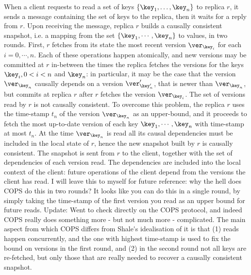 When a client requests to read a set of keys \( \{\key_1, \dots, \key_n\} \) to replica $r$, it sends a message 
containing the set of keys to the replica, then it waits for a reply from $r$. Upon receiving the message, replica $r$ builds a causally consistent snapshot, i.e. 
a mapping from the set $\{\key_{1},\cdots, \key_{n}\}$ to values, in two rounds. 
First, $r$ fetches from its state 
the most recent version \( \ver_{\key_i} \) for each $i =0,\cdots,n$. Each of these operations happen atomically, and 
new versions may be committed at $r$ in-between the times the replica fetches the versions for the keys 
$\key_{i}, 0 < i < n$ and $\key_{n}$: in particular, it may be the case that the version $\ver_{\key_{n}}$ causally depends 
on a version $\ver'_{\key'_{n}}$, that is newer than $\ver_{\key_{n}}$,  but commits at replica $r$ 
after $r$ fetches the version $\ver_{\key_{i}}$. The set of versions read by $r$ is not causally consistent. 
To overcome this problem, the replica $r$ uses the time-stamp $t_{n}$ of the version $\ver_{\key_{n}}$ as an upper-bound, 
and it proceeds to fetch the most up-to-date version of each key $\key_{1}, \cdots, \key_{n}$ with time-stamp 
at most $t_{n}$. At the time $\ver_{\key_{n}}$ is read all its causal dependencies must be included in the local 
state of $r$, hence the new snapshot built by $r$ is causally consistent. The snapshot is sent  from $r$ 
to the client, together with the set of dependencies of each version read. The dependencies are 
included into the local context of the client: future operations of the client depend from the versions 
the client has read.
\ac{I will leave this to myself for future reference: why the hell does COPS do this in two rounds? It looks like you can do 
this in a single round, by simply taking the time-stamp of the first version you read as an upper bound for future reads.
Update: Went to check directly on the COPS protocol, and indeed COPS really does something more - but not much more - complicated. 
The main aspect from which COPS differs from Shale's idealisation of it is that (1) reads happen concurrently, and the 
one with highest time-stamp is used to fix the bound on versions in the first round, and (2) in the second round not all keys 
are re-fetched, but only those that are really needed to recover a causally consistent snapshot.}

